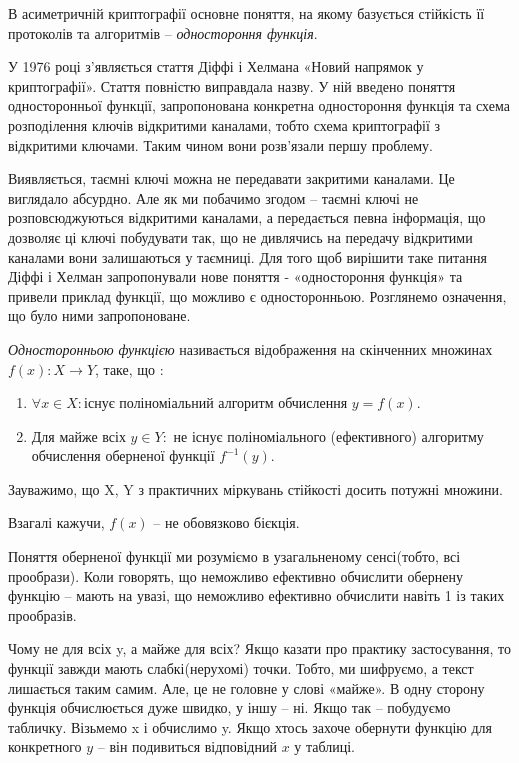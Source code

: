В асиметричній криптографії основне поняття, на якому базується стійкість її протоколів та алгоритмів – \textit{одностороння функція}. 

У 1976 році з’являється стаття Діффі і Хелмана «Новий напрямок у криптографії». Стаття повністю виправдала назву. У ній введено поняття односторонньої функції, запропонована конкретна одностороння функція та схема розподілення ключів відкритими каналами, тобто схема криптографії з відкритими ключами. Таким чином вони розв’язали першу проблему.

Виявляється, таємні ключі можна не передавати закритими каналами. Це виглядало абсурдно. Але як ми побачимо згодом – таємні ключі не розповсюджуються відкритими каналами, а передається певна інформація, що дозволяє ці ключі побудувати так, що не дивлячись на передачу відкритими каналами вони залишаються у таємниці. Для того щоб вирішити таке питання Діффі і Хелман запропонували нове поняття - «одностороння функція» та привели приклад функції, що можливо є односторонньою. Розглянемо означення, що було ними запропоноване.

\begin{mydef}
\textit{Односторонньою функцією} називається відображення на скінченних множинах \( f(x) : X\rightarrow Y \), таке, що :
\begin{enumerate}
\item $\forall x \in X \colon$існує поліноміальний алгоритм обчислення $y = f(x)$.

\item Для майже всіх $y\in Y \colon$ не існує поліноміального (ефективного) алгоритму обчислення оберненої функції $f^{-1}(y)$.
\end{enumerate}
Зауважимо, що X, Y з практичних міркувань стійкості досить потужні множини.\par Взагалі кажучи, $f(x)$ – не обовязково бієкція.
\end{mydef}

Поняття оберненої функції ми розуміємо в узагальненому сенсі(тобто, всі прообрази). Коли говорять, що неможливо ефективно обчислити обернену функцію – мають на увазі, що неможливо ефективно обчислити навіть 1 із таких прообразів.

Чому не для всіх y, а майже для всіх? Якщо казати про практику застосування, то функції завжди мають слабкі(нерухомі) точки. Тобто, ми шифруємо, а текст лишається таким самим. Але, це не головне у слові «майже». В одну сторону функція обчислюється дуже швидко, у іншу – ні. Якщо так – побудуємо  табличку. Візьмемо x і обчислимо y. Якщо хтось захоче обернути функцію для конкретного $y$ – він подивиться відповідний $x$ у таблиці. 

